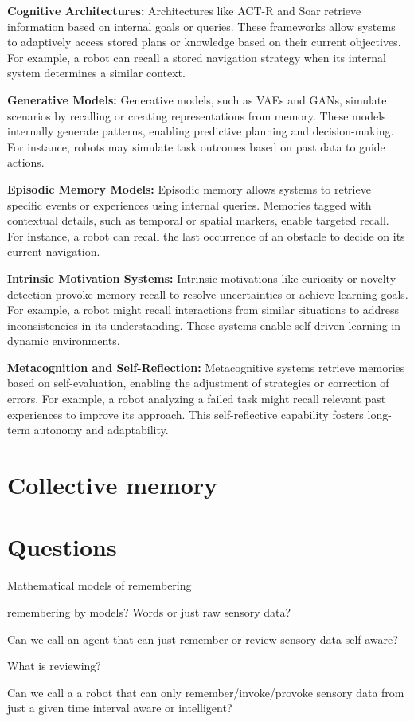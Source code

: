         \textbf{Cognitive Architectures:} Architectures like ACT-R and Soar retrieve information based on internal goals or queries. These frameworks allow systems to adaptively access stored plans or knowledge based on their current objectives. For example, a robot can recall a stored navigation strategy when its internal system determines a similar context. 

        \textbf{Generative Models:} Generative models, such as VAEs and GANs, simulate scenarios by recalling or creating representations from memory. These models internally generate patterns, enabling predictive planning and decision-making. For instance, robots may simulate task outcomes based on past data to guide actions. 

        \textbf{Episodic Memory Models:} Episodic memory allows systems to retrieve specific events or experiences using internal queries. Memories tagged with contextual details, such as temporal or spatial markers, enable targeted recall. For instance, a robot can recall the last occurrence of an obstacle to decide on its current navigation. 

        \textbf{Intrinsic Motivation Systems:} Intrinsic motivations like curiosity or novelty detection provoke memory recall to resolve uncertainties or achieve learning goals. For example, a robot might recall interactions from similar situations to address inconsistencies in its understanding. These systems enable self-driven learning in dynamic environments. 

        \textbf{Metacognition and Self-Reflection:} Metacognitive systems retrieve memories based on self-evaluation, enabling the adjustment of strategies or correction of errors. For example, a robot analyzing a failed task might recall relevant past experiences to improve its approach. This self-reflective capability fosters long-term autonomy and adaptability. 


\section{Collective memory}



\section{Questions}
Mathematical models of remembering

remembering by models? Words or just raw sensory data?

Can we call an agent that can just remember or review sensory data self-aware?

What is reviewing?

Can we call a a robot that can only remember/invoke/provoke sensory data from just a given time interval aware or intelligent?

